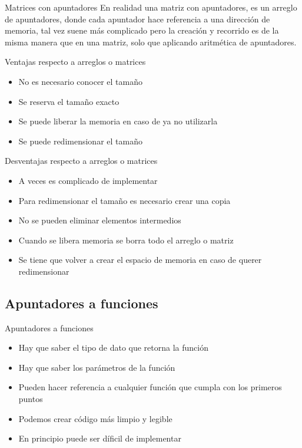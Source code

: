 \documentclass{beamer}
\begin{document}
\begin{frame}{Matrices con apuntadores}
	En realidad una matriz con apuntadores, es un arreglo de apuntadores, donde cada apuntador hace referencia a una direcci\'on de memoria, tal vez suene m\'as complicado pero la creaci\'on y recorrido es de la misma manera que en una matriz, solo que aplicando aritm\'etica de apuntadores.
\end{frame}

\begin{frame}{Ventajas respecto a arreglos o matrices}
	\begin{itemize}
		\item No es necesario conocer el tamaño
		\item Se reserva el tamaño exacto
		\item Se puede liberar la memoria en caso de ya no utilizarla
		\item Se puede redimensionar el tamaño
	\end{itemize}
\end{frame}

\begin{frame}{Desventajas respecto a arreglos o matrices}
	\begin{itemize}
		\item A veces es complicado de implementar 
		\item Para redimensionar el tamaño es necesario crear una copia
		\item No se pueden eliminar elementos intermedios
		\item Cuando se libera memoria se borra todo el arreglo o matriz
		\item Se tiene que volver a crear el espacio de memoria en caso de querer redimensionar
	\end{itemize}
\end{frame}

\subsection{Apuntadores a funciones}

\begin{frame}{Apuntadores a funciones}
	\begin{itemize}
		\item Hay que saber el tipo de dato que retorna la funci\'on
		\item Hay que saber los par\'ametros de la funci\'on
		\item Pueden hacer referencia a cualquier funci\'on que cumpla con los primeros puntos
		\item Podemos crear c\'odigo m\'as limpio y legible
		\item En principio puede ser d\'ificil de implementar
	\end{itemize}
\end{frame}
\end{document}
